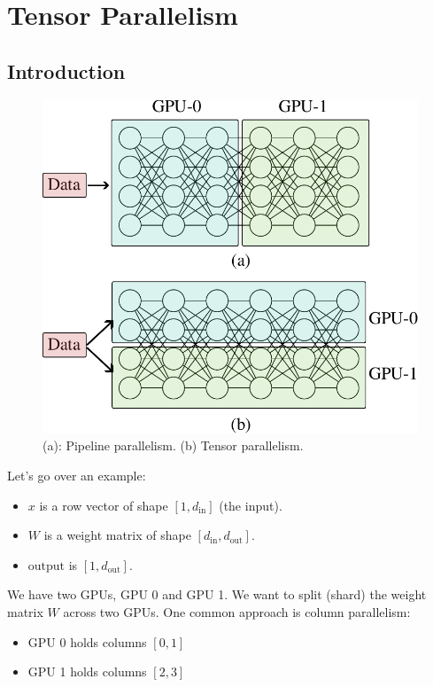 \chapter{Tensor Parallelism}

\section{Introduction}

\begin{figure}[t]
	\centering
	\includegraphics[scale=0.8]{./images/tensor_parallel.pdf}
	\caption{(a): Pipeline parallelism. (b) Tensor parallelism.}
\end{figure}

Let's go over an example:
\begin{itemize}
	\item \( x \) is a row vector of shape \([1, d_\text{in}]\) (the input).  
	\item \( W \) is a weight matrix of shape \([d_\text{in}, d_\text{out}]\).  
	\item \(\text{output}\) is \([1, d_\text{out}]\).
\end{itemize}

We have two GPUs, GPU 0 and GPU 1. We want to split (shard) the weight matrix \( W \) across two GPUs. One common approach is column parallelism:  
\begin{itemize}
	\item GPU 0 holds columns \([0,1]\)  
	\item GPU 1 holds columns \([2,3]\)  
\end{itemize}

